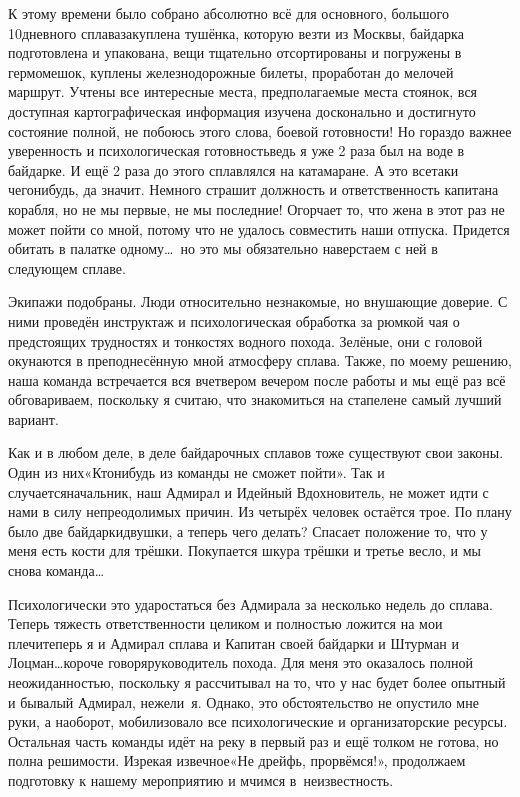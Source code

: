 К этому времени было собрано абсолютно всё для основного, большого 10\sdash дневного сплава\mdash закуплена тушёнка, которую везти из Москвы, байдарка подготовлена и упакована, вещи тщательно отсортированы и погружены в гермомешок, куплены железнодорожные билеты, проработан до мелочей маршрут. Учтены все интересные места, предполагаемые места стоянок, вся доступная картографическая информация изучена досконально и достигнуто состояние полной, не побоюсь этого слова, боевой готовности! Но гораздо  важнее уверенность и психологическая готовность\mdash ведь я уже 2 раза был на воде в байдарке. И ещё 2 раза до этого сплавлялся на катамаране. А это все\sdash таки чего\sdash нибудь, да значит. Немного страшит должность и ответственность капитана корабля, но не мы первые, не мы последние! Огорчает то, что жена в этот раз не может пойти со мной, потому что не удалось совместить наши отпуска. Придется обитать в палатке одному\ldots~но это мы обязательно наверстаем с ней в следующем сплаве. 

Экипажи подобраны. Люди относительно незнакомые, но внушающие доверие. С ними проведён инструктаж и психологическая обработка за рюмкой чая о предстоящих трудностях и тонкостях водного похода. Зелёные, они с головой окунаются в преподнесённую мной атмосферу сплава. Также, по моему решению, наша команда встречается вся вчетвером вечером после работы и мы ещё раз всё обговариваем, поскольку я считаю, что знакомиться на стапеле\mdash не самый лучший вариант.

Как и в любом деле, в деле байдарочных сплавов тоже существуют свои законы. Один из них\mdash «Кто\sdash нибудь из команды не сможет пойти». Так и случается\mdash начальник, наш Адмирал и Идейный Вдохновитель, не может идти с нами в силу непреодолимых причин. Из четырёх человек остаётся трое. По плану было две байдарки\sdash двушки, а теперь чего делать? Спасает положение то, что у меня есть кости для трёшки. Покупается шкура трёшки и третье весло, и мы снова команда\ldots
 
Психологически это удар\mdash остаться без Адмирала за несколько недель до сплава. Теперь тяжесть ответственности целиком и полностью ложится на мои плечи\mdash теперь я и Адмирал сплава и Капитан своей байдарки и Штурман и Лоцман\ldots короче говоря\mdash руководитель похода. Для меня это оказалось полной неожиданностью, поскольку я рассчитывал на то, что у нас будет более опытный и бывалый Адмирал, нежели~я. Однако, это обстоятельство не опустило мне руки, а наоборот, мобилизовало все психологические и организаторские ресурсы. Остальная часть команды идёт на реку в первый раз и ещё толком не готова, но полна решимости. Изрекая извечное\mdash «Не дрейфь, прорвёмся!», продолжаем подготовку к нашему мероприятию и мчимся в~неизвестность. 

\begin{center}
\end{center}